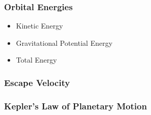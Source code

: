 \documentclass[12pt,compress,aspectratio=169]{beamer}
\begin{document}
\begin{frame}
  \frametitle{Orbital Energies}
  \begin{itemize}
  \item Kinetic Energy
%
%
%    
%
  \item Gravitational Potential Energy
  \item Total Energy
  \end{itemize}
\end{frame}


\begin{frame}
  \frametitle{Escape Velocity}
\end{frame}


\begin{frame}
  \frametitle{Kepler's Law of Planetary Motion}
\end{frame}
\end{document}
